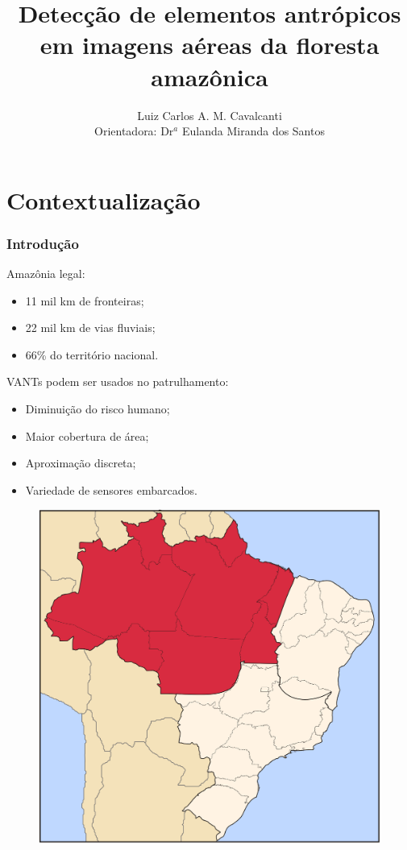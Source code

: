 \documentclass[t]{beamer}
\institute[Universities Here and There] %
{
  Programa de Pós-graduação em Informática\\
  Instituto de Computação\\
  Universidade Federal do Amazonas
}
\title %
{Detecção de elementos antrópicos em imagens aéreas da floresta amazônica}
\author %
{Luiz Carlos A. M. Cavalcanti
\\Orientadora: Dr$^a$ Eulanda Miranda dos Santos} %
\date[] %
{}
\begin{document}
  \begin{frame}\titlepage\end{frame}


\section{Contextualização}

\begin{frame}[c]
\frametitle{Introdução}

	\begin{minipage}{0.7\linewidth}
		Amazônia legal:
		\begin{itemize}
			\item 11 mil km de fronteiras;
			\item 22 mil km de vias fluviais;
			\item 66\% do território nacional.
		\end{itemize}

		\vspace{0.5cm}

		VANTs podem ser usados no patrulhamento:
		\begin{itemize}
			\item Diminuição do risco humano;
			\item Maior cobertura de área;
			\item Aproximação discreta;
			\item Variedade de sensores embarcados.
		\end{itemize}
	\end{minipage}
	\begin{minipage}{0.28\linewidth}
		\begin{figure}[h]
			\includegraphics[width=\textwidth]{imgs/amazonia_legal}
		\end{figure}


\end{minipage}
\end{frame}
\end{document}

